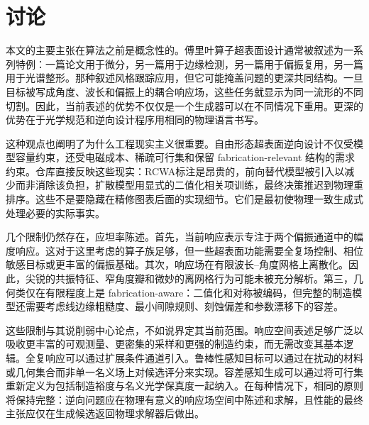 \section{讨论}

本文的主要主张在算法之前是概念性的。傅里叶算子超表面设计通常被叙述为一系列特例：一篇论文用于微分，另一篇用于边缘检测，另一篇用于偏振复用，另一篇用于光谱整形。那种叙述风格跟踪应用，但它可能掩盖问题的更深共同结构。一旦目标被写成角度、波长和偏振上的耦合响应场，这些任务就显示为同一流形的不同切割。因此，当前表述的优势不仅仅是一个生成器可以在不同情况下重用。更深的优势在于光学规范和逆向设计程序用相同的物理语言书写。

这种观点也阐明了为什么工程现实主义很重要。自由形态超表面逆向设计不仅受模型容量约束，还受电磁成本、稀疏可行集和保留 fabrication-relevant 结构的需求约束。仓库直接反映这些现实：RCWA标注是昂贵的，前向替代模型被引入以减少而非消除该负担，扩散模型用显式的二值化相关项训练，最终决策推迟到物理重排序。这些不是要隐藏在精修图表后面的实现细节。它们是最初使物理一致生成式处理必要的实际事实。

几个限制仍然存在，应坦率陈述。首先，当前响应表示专注于两个偏振通道中的幅度响应。这对于这里考虑的算子族足够，但一些超表面功能需要全复场控制、相位敏感目标或更丰富的偏振基础。其次，响应场在有限波长--角度网格上离散化。因此，尖锐的共振特征、窄角度瓣和微妙的离网格行为可能未被充分解析。第三，几何类仅在有限程度上是 fabrication-aware：二值化和对称被编码，但完整的制造模型还需要考虑线边缘粗糙度、最小间隙规则、刻蚀偏差和参数漂移下的容差。

这些限制与其说削弱中心论点，不如说界定其当前范围。响应空间表述足够广泛以吸收更丰富的可观测量、更密集的采样和更强的制造约束，而无需改变其基本逻辑。全复响应可以通过扩展条件通道引入。鲁棒性感知目标可以通过在扰动的材料或几何集合而非单一名义场上对候选评分来实现。容差感知生成可以通过将可行集重新定义为包括制造裕度与名义光学保真度一起纳入。在每种情况下，相同的原则将保持完整：逆向问题应在物理有意义的响应场空间中陈述和求解，且性能的最终主张应仅在生成候选返回物理求解器后做出。
